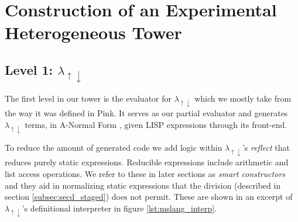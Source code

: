 \documentclass[a4paper,12pt,twoside,openright]{report}
\theoremstyle{definition}
\newcommand{\mslang}{$\lambda_{\uparrow\downarrow}$}
\begin{document}




\section{Construction of an Experimental Heterogeneous Tower}
\subsection{Level 1: \texorpdfstring{\mslang}{Lg}}\label{sec:mslang}

The first level in our tower is the evaluator for \mslang{} which we mostly take from the way it was defined in Pink. It serves as our partial evaluator and generates \mslang{} terms, in A-Normal Form \cite{flanagan1993essence}, given LISP expressions through its front-end.

To reduce the amount of generated code we add logic within \mslang's \textit{reflect} that reduces purely static expressions. Reducible expressions include arithmetic and list access operations. We refer to these in later sections as \textit{smart constructors} and they aid in normalizing static expressions that the division (described in section \ref{subsec:secd_staged}) does not permit. These are shown in an excerpt of \mslang's definitional interpreter in figure \ref{lst:mslang_interp}.
\end{document}
